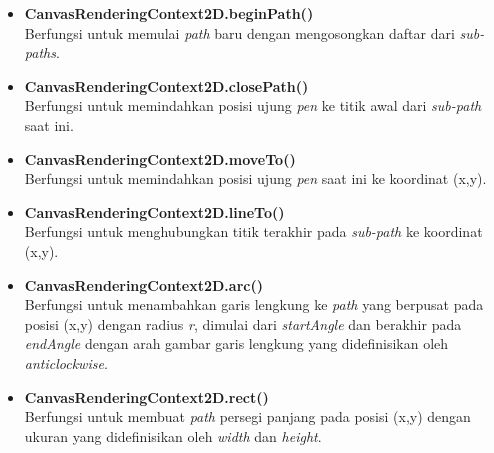 \begin{itemize}
	\item \textbf{CanvasRenderingContext2D.beginPath()} \\ Berfungsi untuk memulai \textit{path} baru dengan mengosongkan daftar dari \textit{sub-paths}.
	\item \textbf{CanvasRenderingContext2D.closePath()} \\ Berfungsi untuk memindahkan posisi ujung \textit{pen} ke titik awal dari \textit{sub-path} saat ini.
	\item \textbf{CanvasRenderingContext2D.moveTo()} \\ Berfungsi untuk memindahkan posisi ujung \textit{pen} saat ini ke koordinat (x,y).
	\item \textbf{CanvasRenderingContext2D.lineTo()} \\ Berfungsi untuk menghubungkan titik terakhir pada \textit{sub-path} ke koordinat (x,y).
	\item \textbf{CanvasRenderingContext2D.arc()} \\ Berfungsi untuk menambahkan garis lengkung ke \textit{path} yang berpusat pada posisi (x,y) dengan radius \textit{r}, dimulai dari \textit{startAngle} dan berakhir pada \textit{endAngle} dengan arah gambar garis lengkung yang didefinisikan oleh \textit{anticlockwise}.
	\item \textbf{CanvasRenderingContext2D.rect()} \\ Berfungsi untuk membuat \textit{path} persegi panjang pada posisi (x,y) dengan ukuran yang didefinisikan oleh \textit{width} dan \textit{height}.
\end{itemize}




